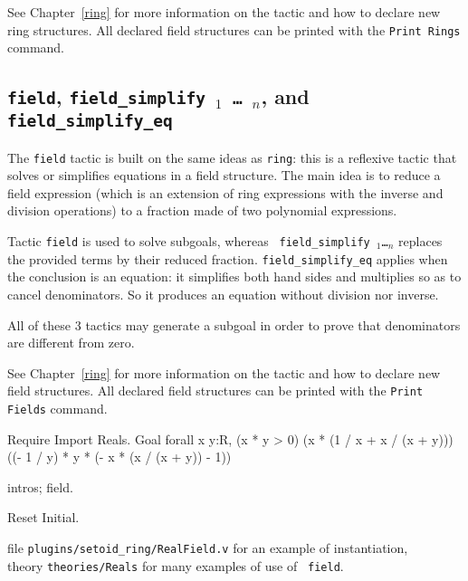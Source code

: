 \begin{coq_example*}
See Chapter~\ref{ring} for more information on the tactic and how to
declare new ring structures.  All declared field structures can be
printed with the {\tt Print Rings} command.

\subsection{{\tt field}, {\tt field\_simplify \term$_1$ \mbox{\dots}
  \term$_n$}, and \tt field\_simplify\_eq}

The {\tt field} tactic is built on the same ideas as {\tt ring}: this
is a reflexive tactic that solves or simplifies equations in a field
structure. The main idea is to reduce a field expression (which is an
extension of ring expressions with the inverse and division
operations) to a fraction made of two polynomial expressions.

Tactic {\tt field} is used to solve subgoals, whereas {\tt
  field\_simplify \term$_1$\dots\term$_n$} replaces the provided terms
by their reduced fraction. {\tt field\_simplify\_eq} applies when the
conclusion is an equation: it simplifies both hand sides and multiplies
so as to cancel denominators. So it produces an equation without
division nor inverse.

All of these 3 tactics may generate a subgoal in order to prove that
denominators are different from zero.

See Chapter~\ref{ring} for more information on the tactic and how to
declare new field structures.  All declared field structures can be
printed with the {\tt Print Fields} command.

\Example
\begin{coq_example*}
Require Import Reals.
Goal forall x y:R,
    (x * y > 0)%
    (x * (1 / x + x / (x + y)))%
    ((- 1 / y) * y * (- x * (x / (x + y)) - 1))%
\end{coq_example*}

\begin{coq_example}
intros; field.
\end{coq_example}

\begin{coq_eval}
Reset Initial.
\end{coq_eval}

\SeeAlso file {\tt plugins/setoid\_ring/RealField.v} for an example of instantiation,\\
\phantom{\SeeAlso}theory {\tt theories/Reals} for many examples of use of {\tt
field}.


\end{coq_example*}
